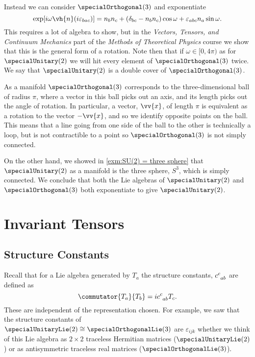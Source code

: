 \documentclass[fleqn]{NotesClass}
\newcommand{\course}[1]{\textit{#1}}
\newcommand{\sphere}[1][n]{S^{#1}}
\newcommand{\isomorphic}{\cong}
\begin{document}
\begin{exm}{}{}
        Instead we can consider \(\specialOrthogonal(3)\) and exponentiate
        \begin{equation}
            \exp[i\omega\vh{n}(i\varepsilon_{bac})] = n_bn_c + (\delta_{bc} - n_bn_c)\cos\omega + \varepsilon_{abc} n_a \sin \omega.
        \end{equation}
        This requires a lot of algebra to show, but in the \course{Vectors, Tensors, and Continuum Mechanics} part of the \course{Methods of Theoretical Physics} course we show that this is the general form of a rotation.
        Note then that if \(\omega \in [0, 4\pi)\) as for \(\specialUnitary(2)\) we will hit every element of \(\specialOrthogonal(3)\) twice.
        We say that \(\specialUnitary(2)\) is a double cover of \(\specialOrthogonal(3)\).
        
        As a manifold \(\specialOrthogonal(3)\) corresponds to the three-dimensional ball of radius \(\pi\), where a vector in this ball picks out an axis, and its length picks out the angle of rotation.
        In particular, a vector, \(\vv{x}\), of length \(\pi\) is equivalent as a rotation to the vector \(-\vv{x}\), and so we identify opposite points on the ball.
        This means that a line going from one side of the ball to the other is technically a loop, but is not contractible to a point so \(\specialOrthogonal(3)\) is not simply connected.
        
        On the other hand, we showed in \cref{exm:SU(2) = three sphere} that \(\specialUnitary(2)\) as a manifold is the three sphere, \(\sphere[3]\), which is simply connected.
        We conclude that both the Lie algebras of \(\specialUnitary(2)\) and \(\specialOrthogonal(3)\) both exponentiate to give \(\specialUnitary(2)\).
    \end{exm}
    
    \chapter{Invariant Tensors}
    \section{Structure Constants}
    Recall that for a Lie algebra generated by \(T_a\) the structure constants, \(\tensor{c}{^c_{ab}}\) are defined as
    \begin{equation}
        \commutator{T_a}{T_b} = i\tensor{c}{^c_{ab}}T_c.
    \end{equation}
    These are independent of the representation chosen.
    For example, we saw that the structure constants of \(\specialUnitaryLie(2) \isomorphic \specialOrthogonalLie(3)\) are \(\varepsilon_{ijk}\) whether we think of this Lie algebra as \(2\times 2\) traceless Hermitian matrices (\(\specialUnitaryLie(2)\)) or as antisymmetric traceless real matrices (\(\specialOrthogonalLie(3)\)).
    
\end{document}
